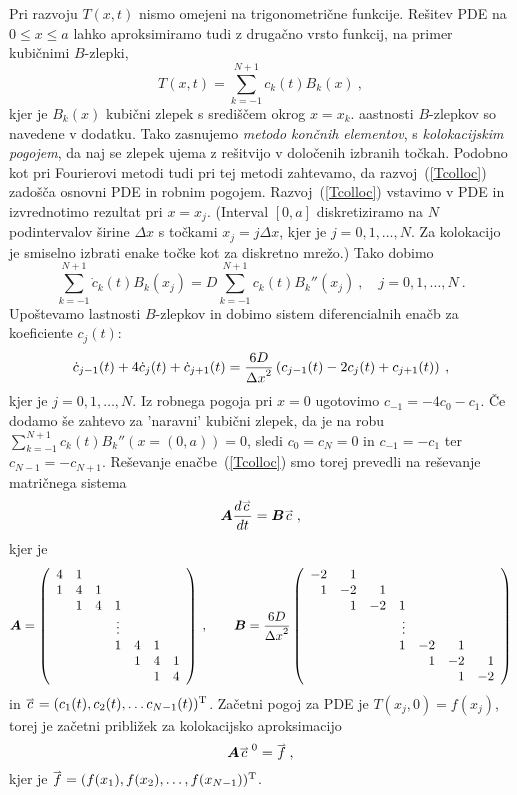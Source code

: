 \documentclass[slovene,11pt,a4paper]{article}
\renewcommand{\vec}[1]{\overset{\smash{\hbox{\raise -0.42ex\hbox{$\scriptscriptstyle\rightharpoonup$}}}}{#1}}
\newcommand{\bi}[1]{\hbox{\boldmath{$#1$}}}
\begin{document}
Pri razvoju $T(x,t)$ nismo omejeni
na trigonometrične funkcije.  Rešitev PDE na $0\le x\le a$
lahko aproksimiramo tudi z drugačno vrsto funkcij,
na primer kubičnimi $B$-zlepki,
\begin{equation}
T(x,t) = \sum_{k=-1}^{N+1} c_k(t) B_k(x) \>,
\label{Tcolloc}
\end{equation}
kjer je $B_k(x)$ kubični zlepek s središčem okrog $x=x_k$.
aastnosti $B$-zlepkov so navedene v dodatku.  Tako zasnujemo
{\sl metodo končnih elementov}, s \emph{kolokacijskim pogojem}, da naj se zlepek
ujema z rešitvijo v določenih izbranih točkah.  Podobno kot pri Fourierovi metodi
tudi pri tej metodi zahtevamo, da razvoj~(\ref{Tcolloc})
zadošča osnovni PDE in robnim pogojem.  Razvoj~(\ref{Tcolloc})
vstavimo v PDE in izvrednotimo rezultat pri $x=x_j$.
(Interval $[0,a]$ diskretiziramo na $N$ podintervalov širine
$\Delta x$ s točkami $x_j=j{\Delta x}$, kjer je $j=0,1,\ldots,N$.
Za kolokacijo je smiselno izbrati enake točke kot za diskretno
mrežo.)  Tako dobimo
$$
\sum_{k=-1}^{N+1} \dot{c}_k(t) B_k(x_j) =
D \sum_{k=-1}^{N+1} c_k(t) B_k''(x_j) \>, \quad j = 0,1,\ldots,N \>.
$$
Upoštevamo lastnosti $B$-zlepkov in dobimo sistem
diferencialnih enačb za koeficiente $c_j(t)$:
$$
\dot{c}_{j-1}(t) + 4\dot{c}_j(t) + \dot{c}_{j+1}(t)
= {6D\over{\Delta x}^2} \left(c_{j-1}(t) - 2c_j(t) + c_{j+1}(t) \right) \>,
$$
kjer je $j=0,1,\ldots,N$.  Iz robnega pogoja pri $x=0$
ugotovimo $c_{-1} = -4c_0 - c_1$. Če dodamo še zahtevo za 'naravni' kubični
zlepek, da je na robu $\sum_{k=-1}^{N+1} c_k(t) B_k''(x=(0,a))=0$, sledi
 $c_0=c_N=0$ in $c_{-1}=-c_1$ ter $c_{N-1}=-c_{N+1}$.
Reševanje enačbe~(\ref{Tcolloc}) smo torej prevedli
na reševanje matričnega sistema
$$
{\bi A}\frac{d\vec{c}}{dt} = {\bi B}\vec{c} \>,
$$
kjer je
$$
{\bi A} = \left(
\begin{array}{ccccccc}
4 & 1 \cr
1 & 4 & 1 \cr
  & 1 & 4 & 1 \cr
  &   &   & \vdots \cr
  &   &   & 1 & 4 & 1 & \cr
  &   &   &   & 1 & 4 & 1 \cr
  &   &   &   &   & 1 & 4
\end{array}
\right) \>, \qquad
{\bi B} = {6D\over{\Delta x}^2} \left(
\begin{array}{rrrrrrr}
-2 & 1 \cr
1 & -2 & 1 \cr
  & 1 & -2 & 1 \cr
  &   &   & \vdots \cr
  &   &   & 1 & -2 & 1 & \cr
  &   &   &   & 1 & -2 & 1 \cr
  &   &   &   &   & 1 & -2
\end{array}
\right)
$$
in $\vec{c} = (c_1(t), c_2(t), \ldots c_{N-1}(t))^\mathrm{T}$.
Začetni pogoj za PDE je $T(x_j,0) = f(x_j)$, torej je začetni
približek za kolokacijsko aproksimacijo
$$
{\bi A}\vec{c}^{\>0} = \vec{f} \>,
$$
kjer je $\vec{f}=(f(x_1),f(x_2),\ldots,f(x_{N-1}))^\mathrm{T}$.
\end{document}
